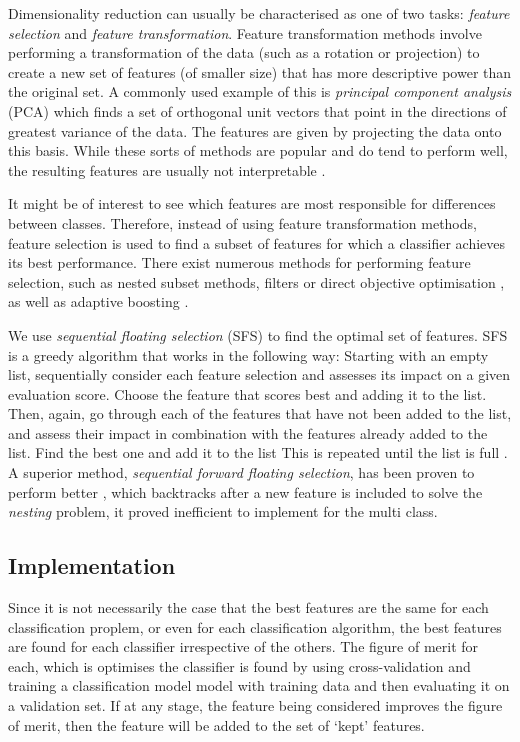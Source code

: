Dimensionality reduction can usually be characterised as one of two tasks: \textit{feature selection} and \textit{feature transformation}. Feature transformation methods involve performing a transformation of the data (such as a rotation or projection) to create a new set of features (of smaller size) that has more descriptive power than the original set. A commonly used example of this is \textit{principal component analysis} (PCA) which finds a set of orthogonal unit vectors that point in the directions of greatest variance of the data. The features are given by projecting the data onto this basis. While these sorts of methods are popular and do tend to perform well, the resulting features are usually not interpretable \cite{Guyon}. 

It might be of interest to see which features are most responsible for differences between classes. Therefore, instead of using feature transformation methods, feature selection is used to find a subset of features for which a classifier achieves its best performance. There exist numerous methods for performing feature selection, such as nested subset methods, filters or direct objective optimisation \cite{Guyon}, as well as adaptive boosting \cite{Wang_2}.

We use \textit{sequential floating selection} (SFS) \cite{Somol} to find the optimal set of features. SFS is a greedy algorithm that works in the following way: Starting with an empty list, sequentially consider each feature selection and assesses its impact on a given evaluation score. Choose the feature that scores best and adding it to the list. Then, again, go through each of the features that have not been added to the list, and assess their impact in combination with the features already added to the list. Find the best one and add it to the list This is repeated until the list is full \cite{Juha}. A superior method, \textit{sequential forward floating selection}, has been proven to perform better \cite{Somol}, which backtracks after a new feature is included to solve the \textit{nesting} problem, it proved inefficient to implement for the multi class.

\subsection{Implementation}
Since it is not necessarily the case that the best features are the same for each classification proplem, or even for each classification algorithm, the best features are found for each classifier irrespective of the others. The figure of merit for each, which is optimises the classifier is found by using cross-validation and training a classification model model with training data and then evaluating it on a validation set. If at any stage, the feature being considered improves the figure of merit, then the feature will be added to the set of `kept' features.

